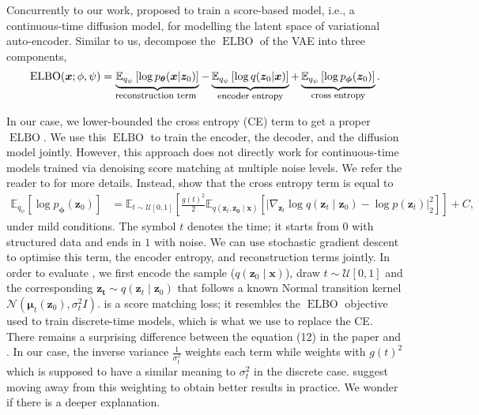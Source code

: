 Concurrently to our work, \citet{vahdat2021score} proposed to train a score-based model, i.e., a continuous-time diffusion model, for modelling the latent space of variational auto-encoder. Similar to us, \citet{vahdat2021score} decompose the $\operatorname{ELBO}$ of the VAE into three components,
\begin{align}
  \operatorname{ELBO}(\mathbf{x}; \phi, \psi) =
  \underbrace{\mathbb{E}_{q_\psi}\left[ \log p_{\mathbf{\theta}}(\mathbf{x}|\mathbf{z}_0)\right]}_{\text{\footnotesize reconstruction term }} -
  \underbrace{\mathbb{E}_{q_\psi}\left[\log q(\mathbf{z}_0|\mathbf{x})\right]}_{\text{\footnotesize{encoder entropy}}} +
  \underbrace{\mathbb{E}_{q_\psi}\left[\log p_{\mathbf{\phi}}(\mathbf{z}_0)\right]}_{\text{\footnotesize{cross entropy}}}.
\end{align}

In our case, we lower-bounded the cross entropy (CE) term to get a proper $\operatorname{ELBO}$. We use this $\operatorname{ELBO}$ to train the encoder, the decoder, and the diffusion model jointly. However, this approach does not directly work for continuous-time models trained via denoising score matching at multiple noise levels. We refer the reader to  for more details. Instead, \citet{vahdat2021score} show that the cross entropy term is equal to
\begin{align}
  \mathbb{E}_{q_\psi}\left[\log p_{\mathbf{\phi}}(\mathbf{z}_0)\right] &= \mathbb{E}_{t \sim \mathcal{U}\left[0, 1\right]}\left[ \frac{g(t)^2}{2} \mathbb{E}_{q(\bm{z}_t, \bm{z_0} \mid \bm{x})}\left[ \lvert \nabla_{\bm{z}_t} \log q(\bm{z}_t \mid \bm{z}_0) - \log p(\bm{z}_t) \rvert_2^2 \right] \right] + C, \label{eq:CE_continuous_diffusion}
\end{align}
under mild conditions. The symbol $t$ denotes the time; it starts from $0$ with structured data and ends in $1$ with noise. We can use stochastic gradient descent to optimise this term, the encoder entropy, and reconstruction terms jointly. In order to evaluate , we first encode the sample ($q(\bm{z}_0 \mid \bm{x})$), draw $t\sim \mathcal{U}\left[0, 1\right]$ and the corresponding $\bm{z_t} \sim q(\bm{z}_t \mid \bm{z}_0)$ that follows a known Normal transition kernel $\mathcal{N}\left( \bm{\mu}_t(\bm{z}_0), \sigma_t^2 I \right)$. \label{eq:CE_continuous_diffusion} is a score matching loss; it resembles the $\operatorname{ELBO}$ objective used to train discrete-time models, which is what we use to replace the CE. There remains a surprising difference between the equation (12) in the paper and . In our case, the inverse variance $\frac{1}{\sigma_t^2}$ weights each term while  weights with $g(t)^2$ which is supposed to have a similar meaning to $\sigma_t^2$ in the discrete case. \citet{vahdat2021score} suggest moving away from this weighting to obtain better results in practice. We wonder if there is a deeper explanation.

